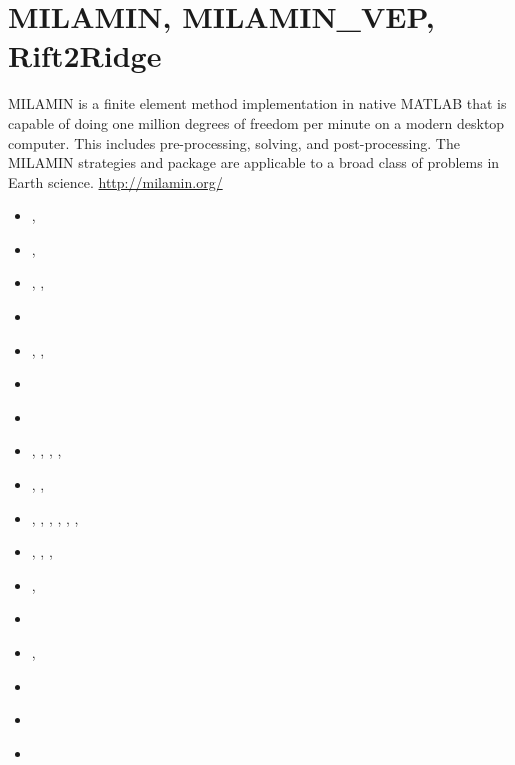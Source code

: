 \section{MILAMIN, MILAMIN\_VEP, Rift2Ridge} 

MILAMIN is a finite element method implementation in native MATLAB that is capable 
of doing one million degrees of freedom per minute on a modern desktop computer. 
This includes pre-processing, solving, and post-processing. The MILAMIN strategies and 
package are applicable to a broad class of problems in Earth science. \url{http://milamin.org/}

\begin{small}
\begin{itemize}
\item[\twothousandeight]       \textcite{daks08},  \textcite{scdk08}
\item[\twothousandnine]        \textcite{gogk09},  \textcite{kalb09}
\item[\twothousandten]         \textcite{krda10},  \textcite{kaus10},  \textcite{dekc10}
\item[\twothousandeleven]      \textcite{yakm11}
\item[\twothousandtwelve]      \textcite{gebk12},  \textcite{rukb12},  \textcite{thka12}
\item[\twothousandthirteen]    \textcite{scpo13}
\item[\twothousandfourteen]    \textcite{jobk14}
\item[\twothousandfifteen]     \textcite{lukz15},  \textcite{gehm15},  \textcite{baka15}, 
                               \textcite{thkp15},  \textcite{musd15}
\item[\twothousandsixteen]     \textcite{jads16},  \textcite{maka16},  \textcite{cakp16}
\item[\twothousandeighteen]    \textcite{dusd18},  \textcite{jasc18},  \textcite{jadg18},
                               \textcite{comj18},  \textcite{jens18},  \textcite{rabw18},
                               \textcite{chsm18}
\item[\twothousandnineteen]    \textcite{sifg19},  \textcite{baba19},  \textcite{sogh19},  
                               \textcite{anpa19}
\item[\twothousandtwenty]      \textcite{hube20},  \textcite{peaa20}
\item[\twothousandtwentytwo]   \textcite{maly22}
\item[\twothousandtwentythree] \textcite{lilm23},  \textcite{rapa23} 
\item[\twothousandtwentyfour]  \textcite{pexc24}
\item[\twothousandtwentyfive]  \textcite{yapl25} 
\item[2027]                    \textcite{lolh27} 
\end{itemize}
\end{small}


